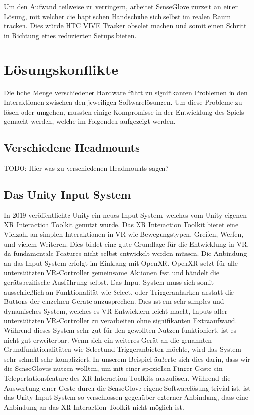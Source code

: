 Um den Aufwand teilweise zu verringern, arbeitet SenseGlove zurzeit an einer Lösung, mit welcher die haptischen Handschuhe sich selbst im realen Raum tracken. Dies würde HTC VIVE Tracker obsolet machen und somit einen Schritt in Richtung eines reduzierten Setups bieten.


\section{Lösungskonflikte}
Die hohe Menge verschiedener Hardware führt zu signifikanten Problemen in den Interaktionen zwischen den jeweiligen Softwarelösungen. Um diese Probleme zu lösen oder umgehen, mussten einige Kompromisse in der Entwicklung des Spiels gemacht werden, welche im Folgenden aufgezeigt werden.

\subsection{Verschiedene Headmounts}
TODO: Hier was zu verschiedenen Headmounts sagen? 

\subsection{Das Unity Input System}
In 2019 veröffentlichte Unity ein neues Input-System, welches vom Unity-eigenen XR Interaction Toolkit genutzt wurde. Das XR Interaction Toolkit bietet eine Vielzahl an simplen Interaktionen in VR wie Bewegungstypen, Greifen, Werfen, und vielem Weiteren. Dies bildet eine gute Grundlage für die Entwicklung in VR, da fundamentale Features nicht selbst entwickelt werden müssen. Die Anbindung an das Input-System erfolgt im Einklang mit OpenXR. OpenXR setzt für alle unterstützten VR-Controller gemeinsame Aktionen fest und händelt die gerätspezifische Ausführung selbst. Das Input-System muss sich somit ausschließlich an Funktionalität wie \dq Select\dq, oder \dq Trigger\dq anharken anstatt die Buttons der einzelnen Geräte anzusprechen. Dies ist ein sehr simples und dynamisches System, welches es VR-Entwicklern leicht macht, Inputs aller unterstützten VR-Controller zu verarbeiten ohne signifikanten Extraaufwand. \\

Während dieses System sehr gut für den gewollten Nutzen funktioniert, ist es nicht gut erweiterbar. Wenn sich ein weiteres Gerät an die genannten Grundfunktionalitäten wie \dq Select\dq und \dq Trigger\dq anbieten möchte, wird das System sehr schnell sehr kompliziert. In unserem Beispiel äußerte sich dies darin, dass wir die SenseGloves nutzen wollten, um mit einer speziellen Finger-Geste ein Teleportationsfeature des XR Interaction Toolkits auszulösen. Während die Auswertung einer Geste durch die SenseGlove-eigene Softwarelösung trivial ist, ist das Unity Input-System so verschlossen gegenüber externer Anbindung, dass eine Anbindung an das XR Interaction Toolkit nicht möglich ist.\\

